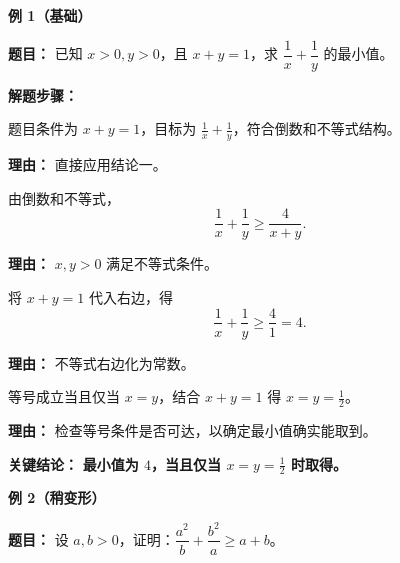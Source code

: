 \begin{examplebox}
\textbf{\textcolor{CExample}{例 1（基础）}}

\textbf{\textcolor{CExample}{题目：}} 已知 $x>0, y>0$，且 $x+y=1$，求 $\dfrac{1}{x}+\dfrac{1}{y}$ 的最小值。

\textbf{\textcolor{CExample}{解题步骤：}}
\begin{description}[style=nextline, leftmargin=2.8em, labelsep=0.5em, itemsep=0.45em]
    \item[\textbf{第一步（识别形式）：}] 题目条件为 $x+y=1$，目标为 $\frac{1}{x}+\frac{1}{y}$，符合倒数和不等式结构。
    \par\textbf{理由：} 直接应用结论一。
    \item[\textbf{第二步（直接应用）：}] 由倒数和不等式，
    \[
    \frac{1}{x} + \frac{1}{y} \ge \frac{4}{x+y}.
    \]
    \par\textbf{理由：} $x,y>0$ 满足不等式条件。
    \item[\textbf{第三步（代入求值）：}] 将 $x+y=1$ 代入右边，得
    \[
    \frac{1}{x} + \frac{1}{y} \ge \frac{4}{1} = 4.
    \]
    \par\textbf{理由：} 不等式右边化为常数。
    \item[\textbf{第四步（取等检查）：}] 等号成立当且仅当 $x=y$，结合 $x+y=1$ 得 $x=y=\frac{1}{2}$。
    \par\textbf{理由：} 检查等号条件是否可达，以确定最小值确实能取到。
\end{description}
\textbf{\textcolor{CExample}{关键结论：}} \textbf{最小值为 $4$，当且仅当 $x=y=\frac{1}{2}$ 时取得。}

\medskip
\textbf{\textcolor{CExample}{例 2（稍变形）}}

\textbf{\textcolor{CExample}{题目：}} 设 $a,b>0$，证明：$\dfrac{a^2}{b} + \dfrac{b^2}{a} \ge a+b$。


\end{examplebox}
